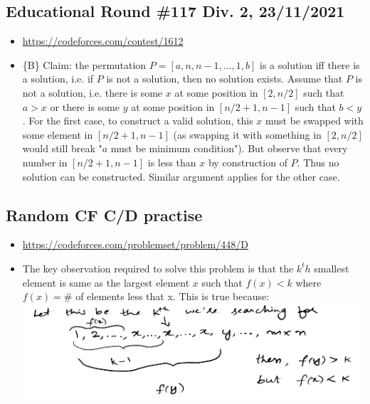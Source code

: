 \documentclass[titlepage, 12pt]{book}
\begin{document}
\subsection{Educational Round \#117 Div. 2, 23/11/2021}
\begin{itemize}
  \item\url{https://codeforces.com/contest/1612}
  \item \{B\} Claim: the permutation $P = [a, n, n - 1, \dots, 1, b]$ is a
    solution iff there is a solution, i.e. if $P$ is not a solution, then no
    solution exists. Assume that $P$ is not a solution, i.e. there is some $x$
    at some position in $[2, n / 2]$ such that $a > x$ or there is some $y$ at some
    position in $[n / 2 + 1, n - 1]$ such that $b < y$. For the first case, to
    construct a valid solution, this $x$ must be swapped with some element in
    $[n / 2 + 1, n - 1]$ (as swapping it with something in $[2, n / 2]$ would
    still break "$a$ must be minimum condition"). But observe that every number
    in $[n / 2 + 1, n - 1]$ is less than $x$ by construction of $P$. Thus no
    solution can be constructed. Similar argument applies for the other case.
\end{itemize}

\subsection{Random CF C/D practise}
\begin{itemize}
  \item\url{https://codeforces.com/problemset/problem/448/D}
  \item The key observation required to solve this problem is that the $k^th$
    smallest element is same as the largest element $x$ such that $f(x) < k$
    where $f(x) = \#$ of elements less that x. This is true because:
    \includegraphics[scale=0.25]{cf448d}
\end{itemize}
\end{document}
